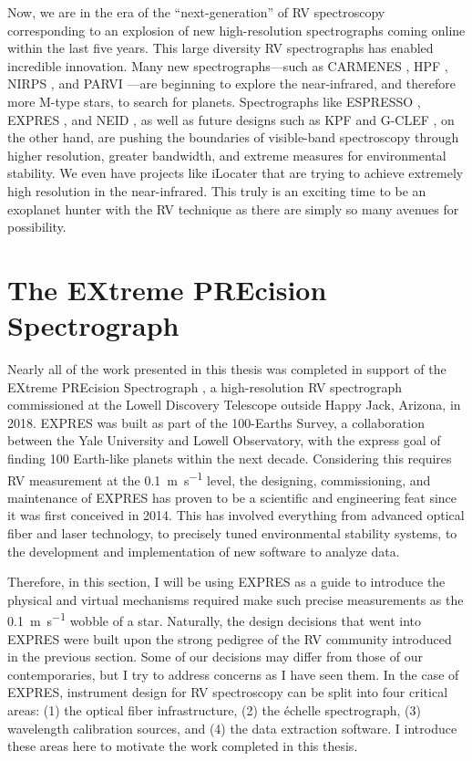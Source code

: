 Now, we are in the era of the ``next-generation'' of RV spectroscopy corresponding to an explosion of new high-resolution spectrographs coming online within the last five years. This large diversity RV spectrographs has enabled incredible innovation. Many new spectrographs---such as CARMENES \citep{quirrenbach_carmenes_2016}, HPF \citep{mahadevan_habitable-zone_2014}, NIRPS \citep{wildi_nirps_2017}, and PARVI \citep{gibson_characterization_2020}---are beginning to explore the near-infrared, and therefore more M-type stars, to search for planets. Spectrographs like ESPRESSO \citep{pepe_espresso_2013}, EXPRES \citep{jurgenson_expres_2016}, and NEID \citep{schwab_design_2016}, as well as future designs such as KPF \citep{gibson_kpf_2016} and G-CLEF \citep{szentgyorgyi_gmt-consortium_2016}, on the other hand, are pushing the boundaries of visible-band spectroscopy through higher resolution, greater bandwidth, and extreme measures for environmental stability. We even have projects like iLocater \citep{crepp_ilocater_2016} that are trying to achieve extremely high resolution in the near-infrared. This truly is an exciting time to be an exoplanet hunter with the RV technique as there are simply so many avenues for possibility.

\section{The EXtreme PREcision Spectrograph} \label{intro:expres}

Nearly all of the work presented in this thesis was completed in support of the EXtreme PREcision Spectrograph \citep[EXPRES;][]{jurgenson_expres_2016, blackman_performance_2020, petersburg_extreme-precision_2020}, a high-resolution RV spectrograph commissioned at the Lowell Discovery Telescope outside Happy Jack, Arizona, in 2018. EXPRES was built as part of the 100-Earths Survey, a collaboration between the Yale University and Lowell Observatory, with the express goal of finding 100 Earth-like planets within the next decade. Considering this requires RV measurement at the 0.1~\si{\meter\per\second} level, the designing, commissioning, and maintenance of EXPRES has proven to be a scientific and engineering feat since it was first conceived in 2014. This has involved everything from advanced optical fiber and laser technology, to precisely tuned environmental stability systems, to the development and implementation of new software to analyze data.

Therefore, in this section, I will be using EXPRES as a guide to introduce the physical and virtual mechanisms required make such precise measurements as the 0.1~\si{\meter\per\second} wobble of a star. Naturally, the design decisions that went into EXPRES were built upon the strong pedigree of the RV community introduced in the previous section. Some of our decisions may differ from those of our contemporaries, but I try to address concerns as I have seen them. In the case of EXPRES, instrument design for RV spectroscopy can be split into four critical areas: (1) the optical fiber infrastructure, (2) the \'echelle spectrograph, (3) wavelength calibration sources, and (4) the data extraction software. I introduce these areas here to motivate the work completed in this thesis.

